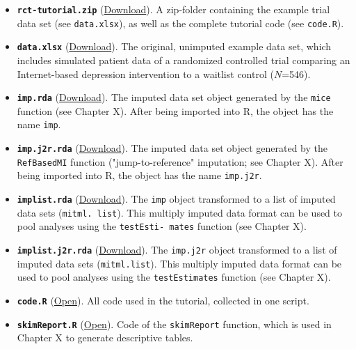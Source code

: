 \begin{itemize}
    \item \textbf{\texttt{rct-tutorial.zip}} (\href{https://github.com/MathiasHarrer/rct-tutorial/blob/main/rct-tutorial.zip?raw=true}{Download}). A zip-folder containing the example trial data set (see \texttt{data.xlsx}), as well as the complete tutorial code (see \texttt{code.R}).
    \item \textbf{\texttt{data.xlsx}} (\href{https://github.com/MathiasHarrer/rct-tutorial/blob/1.0.0/data/data.xlsx?raw=true}{Download}). The original, unimputed example data set, which includes simulated patient data of a randomized controlled trial comparing an Internet-based depression intervention to a waitlist control ($N$=546).
    \item \textbf{\texttt{imp.rda}} (\href{https://github.com/MathiasHarrer/rct-tutorial/blob/1.0.0/data/imp.rda?raw=true}{Download}). The imputed data set object generated by the \texttt{mice} function (see Chapter X). After being imported into \textsf{R}, the object has the name \texttt{imp}.
    \item \textbf{\texttt{imp.j2r.rda}} (\href{https://github.com/MathiasHarrer/rct-tutorial/blob/1.0.0/data/imp.j2r.rda?raw=true}{Download}). The imputed data set object generated by the \texttt{RefBasedMI} function ("jump-to-reference" imputation; see Chapter X). After being imported into \textsf{R}, the object has the name \texttt{imp.j2r}.
    \item \textbf{\texttt{implist.rda}} (\href{https://github.com/MathiasHarrer/rct-tutorial/blob/1.0.0/data/implist.rda?raw=true}{Download}). The \texttt{imp} object transformed to a list of imputed data sets (\texttt{mitml. list}). This multiply imputed data format can be used to pool analyses using the \texttt{testEsti- mates} function (see Chapter X). 
    \item \textbf{\texttt{implist.j2r.rda}} (\href{https://github.com/MathiasHarrer/rct-tutorial/blob/1.0.0/data/implist.j2r.rda?raw=true}{Download}). The \texttt{imp.j2r} object transformed to a list of imputed data sets (\texttt{mitml.list}). This multiply imputed data format can be used to pool analyses using the \texttt{testEstimates} function (see Chapter X). 
    \item \textbf{\texttt{code.R}} (\href{https://raw.githubusercontent.com/MathiasHarrer/rct-tutorial/main/code/code.R}{Open}). All code used in the tutorial, collected in one script.
    \item \textbf{\texttt{skimReport.R}} (\href{https://raw.githubusercontent.com/MathiasHarrer/rct-tutorial/main/code/skimReport.R}{Open}). Code of the \texttt{skimReport} function, which is used in Chapter X to generate descriptive tables. 
\end{itemize}


